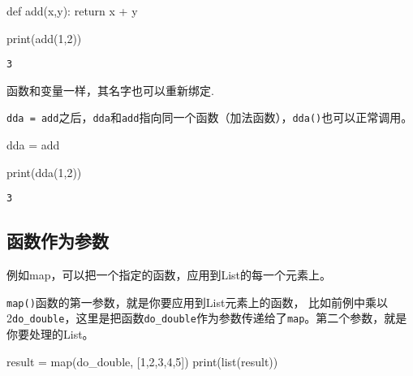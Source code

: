 \documentclass[
  letterpaper,
  DIV=11,
  numbers=noendperiod]{scrreprt}
\newenvironment{Shaded}{\begin{snugshade}}{\end{snugshade}}
\newcommand{\BuiltInTok}[1]{\textcolor[rgb]{0.00,0.23,0.31}{#1}}
\newcommand{\ControlFlowTok}[1]{\textcolor[rgb]{0.00,0.23,0.31}{#1}}
\newcommand{\DecValTok}[1]{\textcolor[rgb]{0.68,0.00,0.00}{#1}}
\newcommand{\KeywordTok}[1]{\textcolor[rgb]{0.00,0.23,0.31}{#1}}
\newcommand{\NormalTok}[1]{\textcolor[rgb]{0.00,0.23,0.31}{#1}}
\newcommand{\OperatorTok}[1]{\textcolor[rgb]{0.37,0.37,0.37}{#1}}
\begin{document}
\begin{Shaded}
\begin{Highlighting}[]
\KeywordTok{def}\NormalTok{ add(x,y):}
    \ControlFlowTok{return}\NormalTok{ x }\OperatorTok{+}\NormalTok{ y}

\BuiltInTok{print}\NormalTok{(add(}\DecValTok{1}\NormalTok{,}\DecValTok{2}\NormalTok{))}
\end{Highlighting}
\end{Shaded}

\begin{verbatim}
3
\end{verbatim}

函数和变量一样，其名字也可以重新绑定.

\texttt{dda\ =\ add}之后，\texttt{dda}和\texttt{add}指向同一个函数（加法函数），\texttt{dda()}也可以正常调用。

\begin{Shaded}
\begin{Highlighting}[]
\NormalTok{dda }\OperatorTok{=}\NormalTok{ add}

\BuiltInTok{print}\NormalTok{(dda(}\DecValTok{1}\NormalTok{,}\DecValTok{2}\NormalTok{))}
\end{Highlighting}
\end{Shaded}

\begin{verbatim}
3
\end{verbatim}

\hypertarget{ux51fdux6570ux4f5cux4e3aux53c2ux6570}{%
\subsection{函数作为参数}\label{ux51fdux6570ux4f5cux4e3aux53c2ux6570}}

例如map，可以把一个指定的函数，应用到List的每一个元素上。

\texttt{map()}函数的第一参数，就是你要应用到List元素上的函数，
比如前例中乘以2\texttt{do\_double}，这里是把函数\texttt{do\_double}作为参数传递给了\texttt{map}。第二个参数，就是你要处理的List。

\begin{Shaded}
\begin{Highlighting}[]
\NormalTok{result }\OperatorTok{=} \BuiltInTok{map}\NormalTok{(do\_double, [}\DecValTok{1}\NormalTok{,}\DecValTok{2}\NormalTok{,}\DecValTok{3}\NormalTok{,}\DecValTok{4}\NormalTok{,}\DecValTok{5}\NormalTok{])}
\BuiltInTok{print}\NormalTok{(}\BuiltInTok{list}\NormalTok{(result))}
\end{Highlighting}
\end{Shaded}
\end{document}
